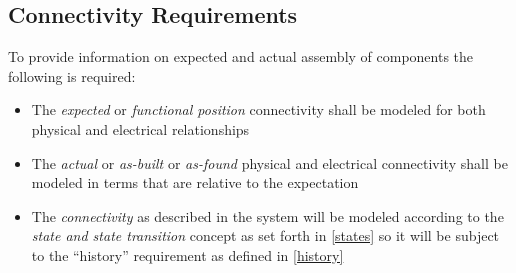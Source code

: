 \documentclass[pdftex,12pt,letter]{article}
\begin{document}





\subsection{Connectivity Requirements}
To provide information on expected and actual assembly of components the following is required:

\begin{itemize}

\item The \textit{expected} or \textit{functional position} connectivity shall be
 modeled for both physical and electrical relationships

\item The \textit{actual} or \textit{as-built} or \textit{as-found} physical and electrical
connectivity shall be modeled in terms that are relative to the expectation

\item The \textit{connectivity} as described in the system will be modeled according to the \textit{state and state transition}
concept as set forth in \ref{states} so it will be subject to the ``history'' requirement as defined in \ref{history}
 
\end{itemize}
\end{document}
